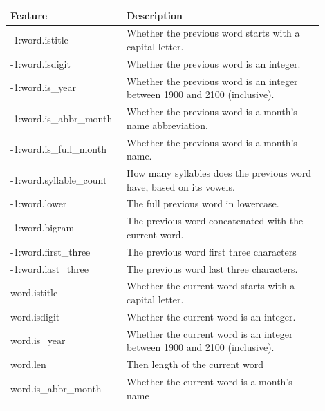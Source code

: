   \begin{table}[pt]
    \centering
    \begin{tabular}{|p{0.3\linewidth}|p{0.6\linewidth}|}
      \hline
      \textbf{Feature} & \textbf{Description} \\
      \hline
      \rowcolor{dark_blue}
      -1:word.istitle & Whether the previous word starts with a capital letter.
      \\
      \hline
      \rowcolor{dark_blue}
      -1:word.isdigit & Whether the previous word is an integer. \\
      \hline
      \rowcolor{dark_blue}
      -1:word.is\_year & Whether the previous word is an integer between 1900
      and 2100 (inclusive). \\
      \hline
      \rowcolor{dark_blue}
      -1:word.is\_abbr\_month & Whether the previous word is a month's name
      abbreviation. \\
      \hline
      \rowcolor{dark_blue}
      -1:word.is\_full\_month & Whether the previous word is a month's name. \\
      \hline
      \rowcolor{dark_blue}
      -1:word.syllable\_count & How many syllables does the previous word have,
      based on its vowels. \\
      \hline
      \rowcolor{dark_blue}
      -1:word.lower & The full previous word in lowercase. \\
      \hline
      \rowcolor{dark_blue}
      -1:word.bigram & The previous word concatenated with the current word. \\
      \hline
      \rowcolor{dark_blue}
      -1:word.first\_three & The previous word first three characters \\
      \hline
      \rowcolor{dark_blue}
      -1:word.last\_three & The previous word last three characters. \\
      \hline
      \rowcolor{blue}
      word.istitle & Whether the current word starts with a capital letter. \\
      \hline
      \rowcolor{blue}
      word.isdigit & Whether the current word is an integer. \\
      \hline
      \rowcolor{blue}
      word.is\_year & Whether the current word is an integer between 1900
      and 2100 (inclusive). \\
      \hline
      \rowcolor{blue}
      word.len & Then length of the current word \\
      \hline
      \rowcolor{blue}
      word.is\_abbr\_month & Whether the current word is a month's name

\end{tabular}
\end{table}
